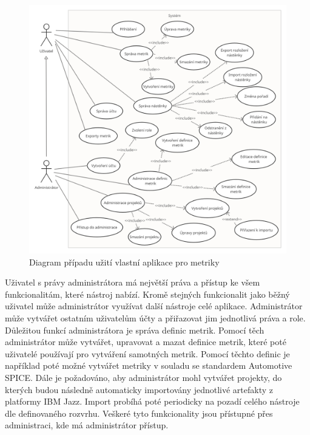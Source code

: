 \documentclass[czech,master]{diploma}
\begin{document}
\begin{figure}[!ht]
    \centering
    \includegraphics[width=1\textwidth]{Diplomka/Figures/use_case_jazz.png}
    \caption{Diagram případu užití vlastní aplikace pro metriky}
    \label{fig:jazz_metrics_use_case}
\end{figure}

Uživatel s právy administrátora má největší práva a přístup ke všem funkcionalitám, které nástroj nabízí. Kromě stejných funkcionalit jako běžný uživatel může administrátor využívat další nástroje celé aplikace. Administrátor může vytvářet ostatním uživatelům účty a přiřazovat jim jednotlivá práva a role. Důležitou funkcí administrátora je správa definic metrik. Pomocí těch administrátor může vytvářet, upravovat a mazat definice metrik, které poté uživatelé používají pro vytváření samotných metrik. Pomocí těchto definic je například poté možné vytvářet metriky v souladu se standardem Automotive SPICE. Dále je požadováno, aby administrátor mohl vytvářet projekty, do kterých budou následně automaticky importovány jednotlivé artefakty z platformy IBM Jazz. Import probíhá poté periodicky na pozadí celého nástroje dle definovaného rozvrhu. Veškeré tyto funkcionality jsou přístupné přes administraci, kde má administrátor přístup.
\end{document}
